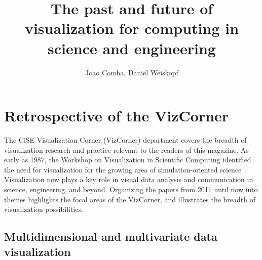 \documentclass[10pt,journal,compsoc]{IEEEtran}
\begin{document}
\title{The past and future of visualization for computing in science and engineering}



\author{%
	Joao Comba, Daniel Weiskopf
	}




\maketitle


\section{Retrospective of the VizCorner}

The CiSE Visualization Corner (VizCorner) department covers the breadth of visualization research and practice relevant to the readers of this magazine. 
As early as 1987, the Workshop on Visualization in Scientific Computing identified the need for visualization for the growing area of simulation-oriented science~\cite{NSFreport1987}. Visualization now plays a key role in visual data analysis and communication in science, engineering, and beyond. 
Organizing the papers from 2011 until now into themes highlights the focal areas of the VizCorner, 
and illustrates the breadth of visualization possibilities.


\subsection*{Multidimensional and multivariate data visualization}
\end{document}
